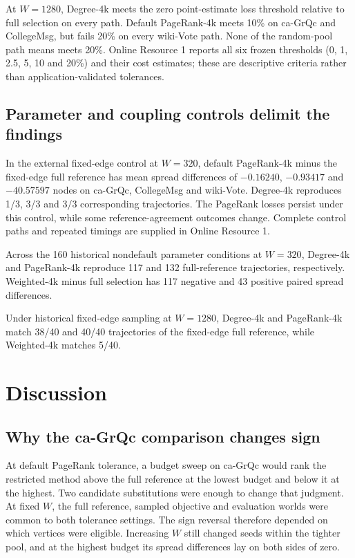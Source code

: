\documentclass[smallextended]{svjour3}
\begin{document}
At $W=1280$, Degree-4k meets the zero point-estimate loss threshold relative to full selection on every path. Default PageRank-4k meets 10\% on ca-GrQc and CollegeMsg, but fails 20\% on every wiki-Vote path. None of the random-pool path means meets 20\%. Online Resource 1 reports all six frozen thresholds (0, 1, 2.5, 5, 10 and 20\%) and their cost estimates; these are descriptive criteria rather than application-validated tolerances.

\subsection{Parameter and coupling controls delimit the findings}

In the external fixed-edge control at $W=320$, default PageRank-4k minus the fixed-edge full reference has mean spread differences of $-0.16240$, $-0.93417$ and $-40.57597$ nodes on ca-GrQc, CollegeMsg and wiki-Vote. Degree-4k reproduces 1/3, 3/3 and 3/3 corresponding trajectories. The PageRank losses persist under this control, while some reference-agreement outcomes change. Complete control paths and repeated timings are supplied in Online Resource 1.

Across the 160 historical nondefault parameter conditions at $W=320$, Degree-4k and PageRank-4k reproduce 117 and 132 full-reference trajectories, respectively. Weighted-4k minus full selection has 117 negative and 43 positive paired spread differences.

Under historical fixed-edge sampling at $W=1280$, Degree-4k and PageRank-4k match 38/40 and 40/40 trajectories of the fixed-edge full reference, while Weighted-4k matches 5/40.
\FloatBarrier

\section{Discussion}
\subsection{Why the ca-GrQc comparison changes sign}
At default PageRank tolerance, a budget sweep on ca-GrQc would rank the restricted method above the full reference at the lowest budget and below it at the highest. Two candidate substitutions were enough to change that judgment. At fixed $W$, the full reference, sampled objective and evaluation worlds were common to both tolerance settings. The sign reversal therefore depended on which vertices were eligible. Increasing $W$ still changed seeds within the tighter pool, and at the highest budget its spread differences lay on both sides of zero.
\end{document}
